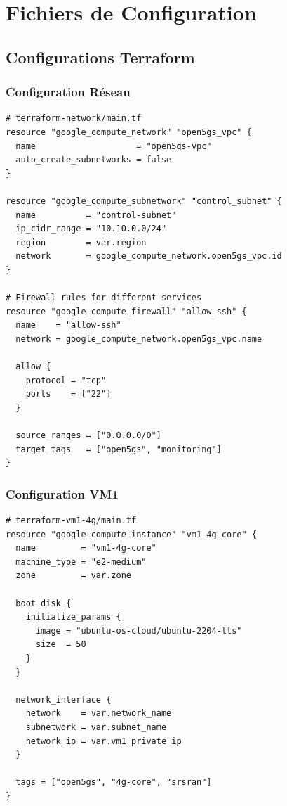 \documentclass[12pt,a4paper]{report}
\begin{document}
\newpage



\appendix

\chapter{Fichiers de Configuration}

\section{Configurations Terraform}

\subsection{Configuration Réseau}

\begin{lstlisting}[caption=Configuration Terraform - Réseau]
# terraform-network/main.tf
resource "google_compute_network" "open5gs_vpc" {
  name                    = "open5gs-vpc"
  auto_create_subnetworks = false
}

resource "google_compute_subnetwork" "control_subnet" {
  name          = "control-subnet"
  ip_cidr_range = "10.10.0.0/24"
  region        = var.region
  network       = google_compute_network.open5gs_vpc.id
}

# Firewall rules for different services
resource "google_compute_firewall" "allow_ssh" {
  name    = "allow-ssh"
  network = google_compute_network.open5gs_vpc.name

  allow {
    protocol = "tcp"
    ports    = ["22"]
  }

  source_ranges = ["0.0.0.0/0"]
  target_tags   = ["open5gs", "monitoring"]
}
\end{lstlisting}

\subsection{Configuration VM1}

\begin{lstlisting}[caption=Configuration Terraform VM1]
# terraform-vm1-4g/main.tf
resource "google_compute_instance" "vm1_4g_core" {
  name         = "vm1-4g-core"
  machine_type = "e2-medium"
  zone         = var.zone

  boot_disk {
    initialize_params {
      image = "ubuntu-os-cloud/ubuntu-2204-lts"
      size  = 50
    }
  }

  network_interface {
    network    = var.network_name
    subnetwork = var.subnet_name
    network_ip = var.vm1_private_ip
  }

  tags = ["open5gs", "4g-core", "srsran"]
}
\end{lstlisting}
\end{document}
